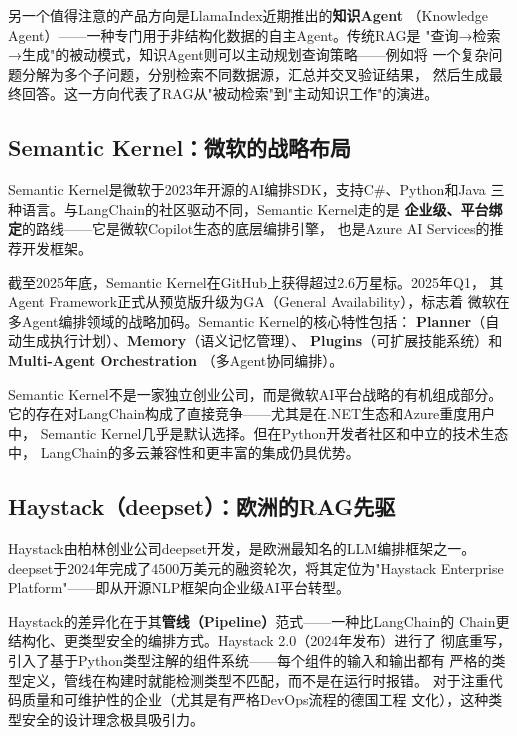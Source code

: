 另一个值得注意的产品方向是LlamaIndex近期推出的\textbf{知识Agent}
（Knowledge Agent）——一种专门用于非结构化数据的自主Agent。传统RAG是
"查询→检索→生成"的被动模式，知识Agent则可以主动规划查询策略——例如将
一个复杂问题分解为多个子问题，分别检索不同数据源，汇总并交叉验证结果，
然后生成最终回答。这一方向代表了RAG从"被动检索"到"主动知识工作"的演进。

\subsection{Semantic Kernel：微软的战略布局}
\label{subsec:semantic-kernel}

Semantic Kernel是微软于2023年开源的AI编排SDK，支持C\#、Python和Java
三种语言。与LangChain的社区驱动不同，Semantic Kernel走的是
\textbf{企业级、平台绑定}的路线——它是微软Copilot生态的底层编排引擎，
也是Azure AI Services的推荐开发框架。

截至2025年底，Semantic Kernel在GitHub上获得超过2.6万星标。2025年Q1，
其Agent Framework正式从预览版升级为GA（General Availability），标志着
微软在多Agent编排领域的战略加码。Semantic Kernel的核心特性包括：
\textbf{Planner}（自动生成执行计划）、\textbf{Memory}（语义记忆管理）、
\textbf{Plugins}（可扩展技能系统）和\textbf{Multi-Agent Orchestration}
（多Agent协同编排）。

Semantic Kernel不是一家独立创业公司，而是微软AI平台战略的有机组成部分。
它的存在对LangChain构成了直接竞争——尤其是在.NET生态和Azure重度用户中，
Semantic Kernel几乎是默认选择。但在Python开发者社区和中立的技术生态中，
LangChain的多云兼容性和更丰富的集成仍具优势。

\subsection{Haystack（deepset）：欧洲的RAG先驱}
\label{subsec:haystack}

Haystack由柏林创业公司deepset开发，是欧洲最知名的LLM编排框架之一。
deepset于2024年完成了4500万美元的融资轮次，将其定位为"Haystack Enterprise
Platform"——即从开源NLP框架向企业级AI平台转型。

Haystack的差异化在于其\textbf{管线（Pipeline）}范式——一种比LangChain的
Chain更结构化、更类型安全的编排方式。Haystack 2.0（2024年发布）进行了
彻底重写，引入了基于Python类型注解的组件系统——每个组件的输入和输出都有
严格的类型定义，管线在构建时就能检测类型不匹配，而不是在运行时报错。
对于注重代码质量和可维护性的企业（尤其是有严格DevOps流程的德国工程
文化），这种类型安全的设计理念极具吸引力。

